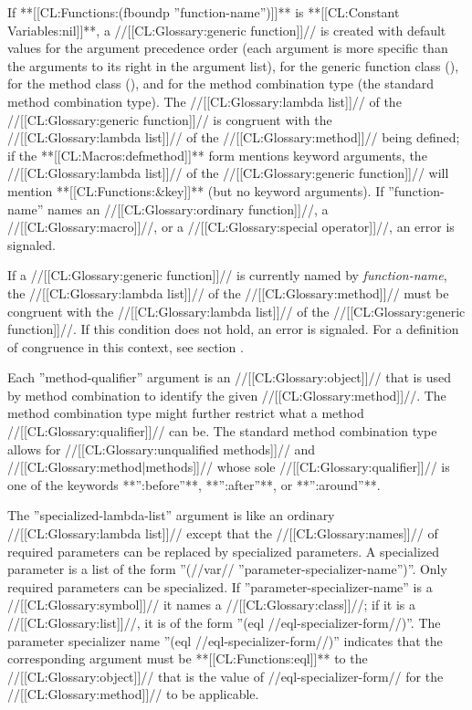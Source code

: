 If **[[CL:Functions:(fboundp ''function-name'')]]** is **[[CL:Constant Variables:nil]]**, a //[[CL:Glossary:generic function]]// is created with default values for the argument precedence order (each argument is more specific than the arguments to its right in the argument list), for the generic function class (), for the method class (), and for the method combination type (the standard method combination type). The //[[CL:Glossary:lambda list]]// of the //[[CL:Glossary:generic function]]// is congruent with the //[[CL:Glossary:lambda list]]// of the //[[CL:Glossary:method]]// being defined; if the **[[CL:Macros:defmethod]]** form mentions keyword arguments, the //[[CL:Glossary:lambda list]]// of the //[[CL:Glossary:generic function]]// will mention **[[CL:Functions:&key]]** (but no keyword arguments). If ''function-name'' names an //[[CL:Glossary:ordinary function]]//, a //[[CL:Glossary:macro]]//, or a //[[CL:Glossary:special operator]]//, an error is signaled.

If a //[[CL:Glossary:generic function]]// is currently named by {\it function-name}, the //[[CL:Glossary:lambda list]]// of the //[[CL:Glossary:method]]// must be congruent with the //[[CL:Glossary:lambda list]]// of the //[[CL:Glossary:generic function]]//. If this condition does not hold, an error is signaled. For a definition of congruence in this context, see section {\secref\GFMethodLambdaListCongruency}.

Each ''method-qualifier'' argument is an //[[CL:Glossary:object]]// that is used by method combination to identify the given //[[CL:Glossary:method]]//. The method combination type might further restrict what a method //[[CL:Glossary:qualifier]]// can be. The standard method combination type allows for //[[CL:Glossary:unqualified methods]]// and //[[CL:Glossary:method|methods]]// whose sole //[[CL:Glossary:qualifier]]// is one of the keywords **'':before''**, **'':after''**, or **'':around''**.

The ''specialized-lambda-list'' argument is like an ordinary //[[CL:Glossary:lambda list]]// except that the //[[CL:Glossary:names]]// of required parameters can be replaced by specialized parameters. A specialized parameter is a list of the form ''(//var// ''parameter-specializer-name'')''. Only required parameters can be specialized. If ''parameter-specializer-name'' is a //[[CL:Glossary:symbol]]// it names a //[[CL:Glossary:class]]//; if it is a //[[CL:Glossary:list]]//, it is of the form ''(eql //eql-specializer-form//)''. The parameter specializer name ''(eql //eql-specializer-form//)'' indicates that the corresponding argument must be **[[CL:Functions:eql]]** to the //[[CL:Glossary:object]]// that is the value of //eql-specializer-form// for the //[[CL:Glossary:method]]// to be applicable.

